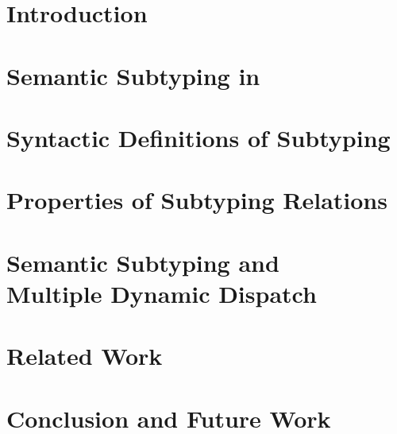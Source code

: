 \documentclass[sigplan]{acmart}\settopmatter{}
\begin{document}
\section{Introduction}\label{sec:intro}




\section{Semantic Subtyping in \BetaJulia}\label{sec:semsub}




\section{Syntactic Definitions of Subtyping}\label{sec:synsub}






\section{Properties of Subtyping Relations}\label{sec:proofs}




\section{Semantic Subtyping and\\ Multiple Dynamic Dispatch}
\label{sec:discussion}




\section{Related Work}




\section{Conclusion and Future Work}


\end{document}
